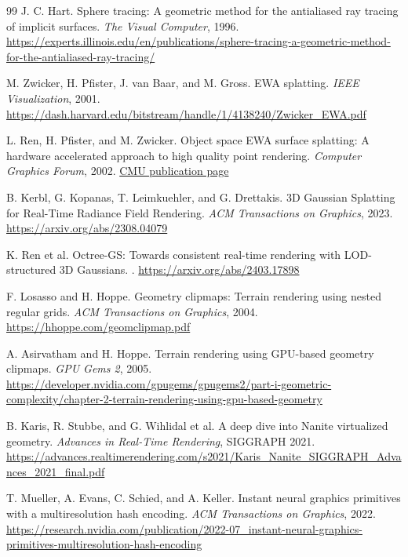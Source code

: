 \documentclass[11pt]{article}
\begin{document}
\begin{thebibliography}{99}
J. C. Hart.
\newblock Sphere tracing: A geometric method for the antialiased ray tracing of implicit surfaces.
\newblock \emph{The Visual Computer}, 1996.
\newblock \url{https://experts.illinois.edu/en/publications/sphere-tracing-a-geometric-method-for-the-antialiased-ray-tracing/}

M. Zwicker, H. Pfister, J. van Baar, and M. Gross.
\newblock EWA splatting.
\newblock \emph{IEEE Visualization}, 2001.
\newblock \url{https://dash.harvard.edu/bitstream/handle/1/4138240/Zwicker_EWA.pdf}

L. Ren, H. Pfister, and M. Zwicker.
\newblock Object space EWA surface splatting: A hardware accelerated approach to high quality point rendering.
\newblock \emph{Computer Graphics Forum}, 2002.
\newblock \href{https://publications.ri.cmu.edu/object-space-ewa-surface-splatting-a-hardware-accelerated-approach-to-high-quality-point-rendering/}{CMU publication page}

B. Kerbl, G. Kopanas, T. Leimkuehler, and G. Drettakis.
\newblock 3D Gaussian Splatting for Real-Time Radiance Field Rendering.
\newblock \emph{ACM Transactions on Graphics}, 2023.
\newblock \url{https://arxiv.org/abs/2308.04079}

K. Ren et al.
\newblock Octree-GS: Towards consistent real-time rendering with LOD-structured 3D Gaussians.
.
\newblock \url{https://arxiv.org/abs/2403.17898}

F. Losasso and H. Hoppe.
\newblock Geometry clipmaps: Terrain rendering using nested regular grids.
\newblock \emph{ACM Transactions on Graphics}, 2004.
\newblock \url{https://hhoppe.com/geomclipmap.pdf}

A. Asirvatham and H. Hoppe.
\newblock Terrain rendering using GPU-based geometry clipmaps.
\newblock \emph{GPU Gems 2}, 2005.
\newblock \url{https://developer.nvidia.com/gpugems/gpugems2/part-i-geometric-complexity/chapter-2-terrain-rendering-using-gpu-based-geometry}

B. Karis, R. Stubbe, and G. Wihlidal et al.
\newblock A deep dive into Nanite virtualized geometry.
\newblock \emph{Advances in Real-Time Rendering}, SIGGRAPH 2021.
\newblock \url{https://advances.realtimerendering.com/s2021/Karis_Nanite_SIGGRAPH_Advances_2021_final.pdf}

T. Mueller, A. Evans, C. Schied, and A. Keller.
\newblock Instant neural graphics primitives with a multiresolution hash encoding.
\newblock \emph{ACM Transactions on Graphics}, 2022.
\newblock \url{https://research.nvidia.com/publication/2022-07_instant-neural-graphics-primitives-multiresolution-hash-encoding}


\end{thebibliography}
\end{document}
